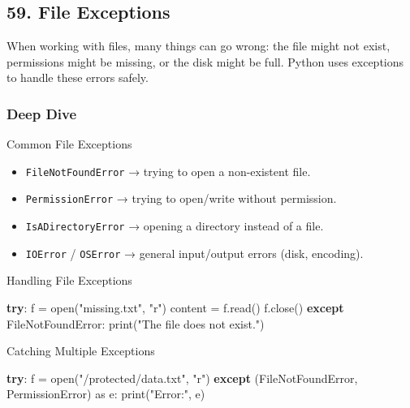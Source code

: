 \documentclass[
  letterpaper,
  DIV=11,
  numbers=noendperiod]{scrreprt}
\newenvironment{Shaded}{\begin{snugshade}}{\end{snugshade}}
\newcommand{\BuiltInTok}[1]{\textcolor[rgb]{0.00,0.23,0.31}{#1}}
\newcommand{\ControlFlowTok}[1]{\textcolor[rgb]{0.00,0.23,0.31}{\textbf{#1}}}
\newcommand{\ImportTok}[1]{\textcolor[rgb]{0.00,0.46,0.62}{#1}}
\newcommand{\NormalTok}[1]{\textcolor[rgb]{0.00,0.23,0.31}{#1}}
\newcommand{\OperatorTok}[1]{\textcolor[rgb]{0.37,0.37,0.37}{#1}}
\newcommand{\PreprocessorTok}[1]{\textcolor[rgb]{0.68,0.00,0.00}{#1}}
\newcommand{\StringTok}[1]{\textcolor[rgb]{0.13,0.47,0.30}{#1}}
\providecommand{\tightlist}{%
  \setlength{\itemsep}{0pt}\setlength{\parskip}{0pt}}
\begin{document}
\subsection{59. File Exceptions}\label{file-exceptions}

When working with files, many things can go wrong: the file might not
exist, permissions might be missing, or the disk might be full. Python
uses exceptions to handle these errors safely.

\subsubsection{Deep Dive}\label{deep-dive-58}

Common File Exceptions

\begin{itemize}
\tightlist
\item
  \texttt{FileNotFoundError} → trying to open a non-existent file.
\item
  \texttt{PermissionError} → trying to open/write without permission.
\item
  \texttt{IsADirectoryError} → opening a directory instead of a file.
\item
  \texttt{IOError} / \texttt{OSError} → general input/output errors
  (disk, encoding).
\end{itemize}

Handling File Exceptions

\begin{Shaded}
\begin{Highlighting}[]
\ControlFlowTok{try}\NormalTok{:}
\NormalTok{    f }\OperatorTok{=} \BuiltInTok{open}\NormalTok{(}\StringTok{"missing.txt"}\NormalTok{, }\StringTok{"r"}\NormalTok{)}
\NormalTok{    content }\OperatorTok{=}\NormalTok{ f.read()}
\NormalTok{    f.close()}
\ControlFlowTok{except} \PreprocessorTok{FileNotFoundError}\NormalTok{:}
    \BuiltInTok{print}\NormalTok{(}\StringTok{"The file does not exist."}\NormalTok{)}
\end{Highlighting}
\end{Shaded}

Catching Multiple Exceptions

\begin{Shaded}
\begin{Highlighting}[]
\ControlFlowTok{try}\NormalTok{:}
\NormalTok{    f }\OperatorTok{=} \BuiltInTok{open}\NormalTok{(}\StringTok{"/protected/data.txt"}\NormalTok{, }\StringTok{"r"}\NormalTok{)}
\ControlFlowTok{except}\NormalTok{ (}\PreprocessorTok{FileNotFoundError}\NormalTok{, }\PreprocessorTok{PermissionError}\NormalTok{) }\ImportTok{as}\NormalTok{ e:}
    \BuiltInTok{print}\NormalTok{(}\StringTok{"Error:"}\NormalTok{, e)}
\end{Highlighting}
\end{Shaded}
\end{document}
